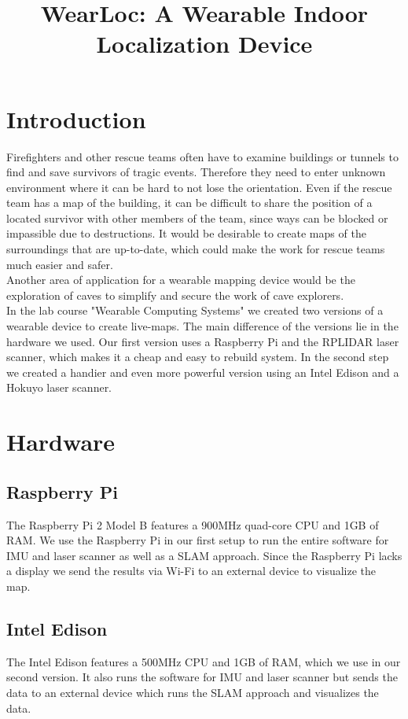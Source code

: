 \documentclass{sigchi-ext}
\title{WearLoc: A Wearable Indoor Localization Device}
\author{%
  \alignauthor{%
    \textbf{Lukas Gemein}\\
    \email{gemeinl@cs.uni-freiburg.de} }\alignauthor{%
    \textbf{Jennifer Nist}\\
    \email{nistj@cs.uni-freiburg.de} } \vfil \alignauthor{%
    \textbf{Rick Gelhausen}\\
    \email{rick.gelhausen@gmail.com} }\alignauthor{%
    \textbf{David Speck}\\
    \email{speckd@cs.uni-freiburg.de} } \vfil \alignauthor{%
    \textbf{Andre Biedenkapp}\\   
    \email{biedenka@cs.uni-freiburg.de}}}
\begin{document}
\maketitle

\RaggedRight{} 

\section{Introduction}
Firefighters and other rescue teams often have to examine buildings or tunnels to find and save survivors of tragic events. Therefore they need to enter unknown environment where it can be hard to not lose the orientation. Even if the rescue team has a map of the building, it can be difficult to share the position of a located survivor with other members of the team, since ways can be blocked or impassible due to destructions. It would be desirable to create maps of the surroundings that are up-to-date, which could make the work for rescue teams much easier and safer.\\
Another area of application for a wearable mapping device would be the exploration of caves to simplify and secure the work of cave explorers.\\
In the lab course "Wearable Computing Systems" we created two versions of a wearable device to create live-maps. The main difference of the versions lie in the hardware we used. Our first version uses a Raspberry Pi and the RPLIDAR laser scanner, which makes it a cheap and easy to rebuild system. In the second step we created a handier and even more powerful version using an Intel Edison and a Hokuyo laser scanner.

\newpage
\section{Hardware}
\subsection{Raspberry Pi}
The Raspberry Pi 2 Model B features a 900MHz quad-core CPU and 1GB of RAM. We use the Raspberry Pi in our first setup to run the entire software for IMU and laser scanner as well as a SLAM approach. Since the Raspberry Pi lacks a display we send the results via Wi-Fi to an external device to visualize the map.

\subsection{Intel Edison}
The Intel Edison features a 500MHz CPU and 1GB of RAM, which we use in our second version. It also runs the software for IMU and laser scanner but sends the data to an external device which runs the SLAM approach and visualizes the data.
\end{document}

